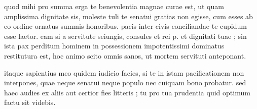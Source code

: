 


 quod mihi pro summa erga te benevolentia magnae curae est, ut quam amplissima dignitate sis, moleste tuli te senatui gratias non egisse, cum esses ab eo ordine ornatus summis honoribus. pacis inter civis conciliandae te cupidum esse laetor. eam si a servitute seiungis, consules et rei p. et dignitati tuae ; sin ista pax perditum hominem in possessionem impotentissimi dominatus restitutura est, hoc animo scito omnis sanos, ut mortem servituti anteponant.

 itaque sapientius meo quidem iudicio facies, si te in istam pacificationem non interpones, quae neque senatui neque populo nec cuiquam bono probatur. sed haec audies ex aliis aut certior fies litteris ; tu pro tua prudentia quid optimum factu sit videbis.

